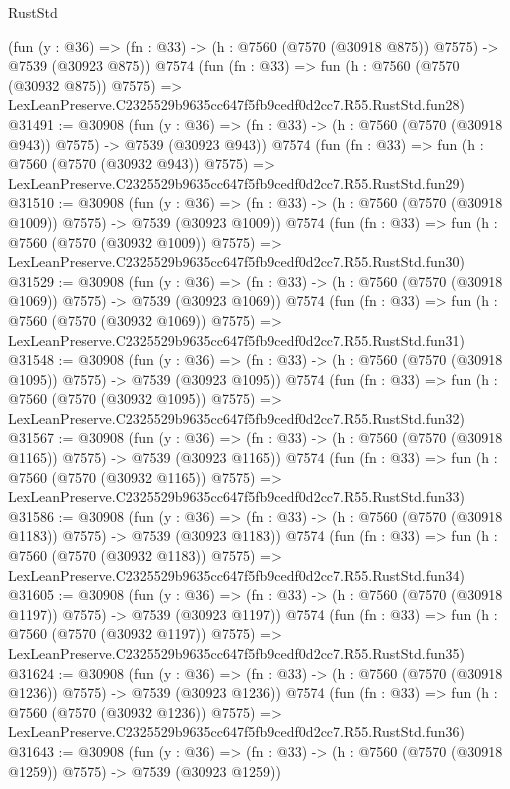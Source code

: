 \begin{lexlean}{RustStd}
\begin{coremodule}
    (fun (y : @36) => (fn : @33) -> (h : @7560 (@7570 (@30918 @875)) @7575) -> @7539 (@30923 @875))
    @7574
    (fun (fn : @33) =>
    fun (h : @7560 (@7570 (@30932 @875)) @7575) =>
    LexLeanPreserve.C2325529b9635cc647f5fb9cedf0d2cc7.R55.RustStd.fun28)
@31491 := @30908
    (fun (y : @36) => (fn : @33) -> (h : @7560 (@7570 (@30918 @943)) @7575) -> @7539 (@30923 @943))
    @7574
    (fun (fn : @33) =>
    fun (h : @7560 (@7570 (@30932 @943)) @7575) =>
    LexLeanPreserve.C2325529b9635cc647f5fb9cedf0d2cc7.R55.RustStd.fun29)
@31510 := @30908
    (fun (y : @36) =>
    (fn : @33) -> (h : @7560 (@7570 (@30918 @1009)) @7575) -> @7539 (@30923 @1009))
    @7574
    (fun (fn : @33) =>
    fun (h : @7560 (@7570 (@30932 @1009)) @7575) =>
    LexLeanPreserve.C2325529b9635cc647f5fb9cedf0d2cc7.R55.RustStd.fun30)
@31529 := @30908
    (fun (y : @36) =>
    (fn : @33) -> (h : @7560 (@7570 (@30918 @1069)) @7575) -> @7539 (@30923 @1069))
    @7574
    (fun (fn : @33) =>
    fun (h : @7560 (@7570 (@30932 @1069)) @7575) =>
    LexLeanPreserve.C2325529b9635cc647f5fb9cedf0d2cc7.R55.RustStd.fun31)
@31548 := @30908
    (fun (y : @36) =>
    (fn : @33) -> (h : @7560 (@7570 (@30918 @1095)) @7575) -> @7539 (@30923 @1095))
    @7574
    (fun (fn : @33) =>
    fun (h : @7560 (@7570 (@30932 @1095)) @7575) =>
    LexLeanPreserve.C2325529b9635cc647f5fb9cedf0d2cc7.R55.RustStd.fun32)
@31567 := @30908
    (fun (y : @36) =>
    (fn : @33) -> (h : @7560 (@7570 (@30918 @1165)) @7575) -> @7539 (@30923 @1165))
    @7574
    (fun (fn : @33) =>
    fun (h : @7560 (@7570 (@30932 @1165)) @7575) =>
    LexLeanPreserve.C2325529b9635cc647f5fb9cedf0d2cc7.R55.RustStd.fun33)
@31586 := @30908
    (fun (y : @36) =>
    (fn : @33) -> (h : @7560 (@7570 (@30918 @1183)) @7575) -> @7539 (@30923 @1183))
    @7574
    (fun (fn : @33) =>
    fun (h : @7560 (@7570 (@30932 @1183)) @7575) =>
    LexLeanPreserve.C2325529b9635cc647f5fb9cedf0d2cc7.R55.RustStd.fun34)
@31605 := @30908
    (fun (y : @36) =>
    (fn : @33) -> (h : @7560 (@7570 (@30918 @1197)) @7575) -> @7539 (@30923 @1197))
    @7574
    (fun (fn : @33) =>
    fun (h : @7560 (@7570 (@30932 @1197)) @7575) =>
    LexLeanPreserve.C2325529b9635cc647f5fb9cedf0d2cc7.R55.RustStd.fun35)
@31624 := @30908
    (fun (y : @36) =>
    (fn : @33) -> (h : @7560 (@7570 (@30918 @1236)) @7575) -> @7539 (@30923 @1236))
    @7574
    (fun (fn : @33) =>
    fun (h : @7560 (@7570 (@30932 @1236)) @7575) =>
    LexLeanPreserve.C2325529b9635cc647f5fb9cedf0d2cc7.R55.RustStd.fun36)
@31643 := @30908
    (fun (y : @36) =>
    (fn : @33) -> (h : @7560 (@7570 (@30918 @1259)) @7575) -> @7539 (@30923 @1259))

\end{coremodule}
\end{lexlean}
